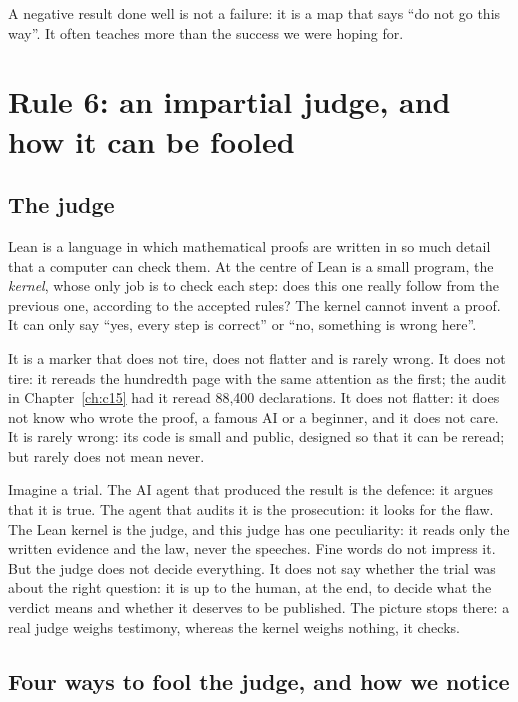 A negative result done well is not a failure: it is a map that says ``do not go this way''. It often teaches more than
the success we were hoping for.

\section{Rule 6: an impartial judge, and how it can be fooled}

\subsection{The judge}

Lean is a language in which mathematical proofs are written in so much detail that a computer can check them. At the
centre of Lean is a small program, the \emph{kernel}, whose only job is to check each step: does this one really
follow from the previous one, according to the accepted rules? The kernel cannot invent a proof. It can only say
``yes, every step is correct'' or ``no, something is wrong here''.

It is a marker that does not tire, does not flatter and is rarely wrong. It does not tire: it rereads the hundredth
page with the same attention as the first; the audit in Chapter~\ref{ch:c15} had it reread 88,400 declarations. It does
not flatter: it does not know who wrote the proof, a famous AI or a beginner, and it does not care. It is rarely wrong:
its code is small and public, designed so that it can be reread; but rarely does not mean never.

\begin{analogie}
Imagine a trial. The AI agent that produced the result is the defence: it argues that it is true. The agent that
audits it is the prosecution: it looks for the flaw. The Lean kernel is the judge, and this judge has one peculiarity:
it reads only the written evidence and the law, never the speeches. Fine words do not impress it. But the judge does
not decide everything. It does not say whether the trial was about the right question: it is up to the human, at the
end, to decide what the verdict means and whether it deserves to be published. The picture stops there: a real judge
weighs testimony, whereas the kernel weighs nothing, it checks.
\end{analogie}

\subsection{Four ways to fool the judge, and how we notice}

